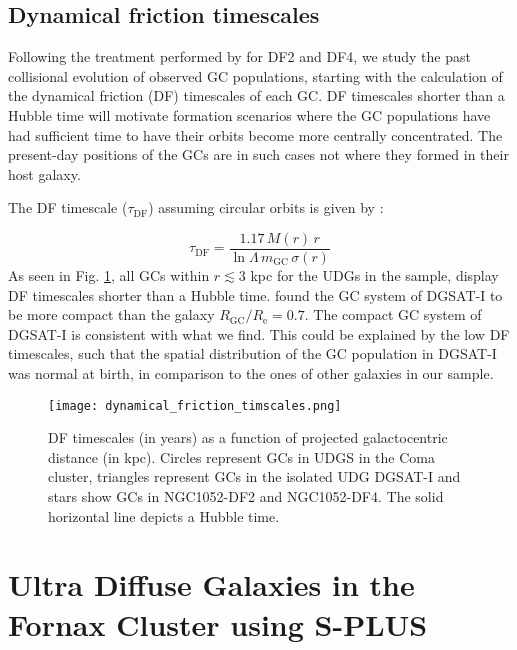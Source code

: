 \documentclass[baaa]{baaa}
\begin{document}
\subsection{Dynamical friction timescales }\label{subsec:DF}
Following the treatment performed by \cite{Leigh_Fragione} for DF2 and DF4, we study the past collisional evolution of observed GC populations, starting with the calculation of the dynamical friction (DF) timescales of each GC. DF timescales shorter than a Hubble time will motivate formation scenarios where the GC populations have had sufficient time to have their orbits become more centrally concentrated.   The present-day positions of the GCs are in such cases not where they formed in their host galaxy. 

The DF timescale ($\tau_{\textrm{DF}}$) assuming circular orbits is given by \citep{binney_tremaine_1987,gnedin_df}:

\begin{equation}
    \tau_{\textrm{DF}} = \frac{1.17 \, M(r) \, r}{\ln \Lambda \, m_{\textrm{GC}} \, \sigma(r)}
\end{equation}
As seen in Fig. \ref{fig:DFtimescales}, all GCs within $r\lesssim 3$ kpc for the UDGs in the sample, display DF timescales shorter than a Hubble time. \cite{Janssens2022} found the GC system of DGSAT-I to be more compact than the galaxy $R_{\textrm{GC}}/R_{\textrm{e}}=0.7$. The compact GC system of DGSAT-I is consistent with what we find.
This could be explained by the low DF timescales, such that the spatial distribution of the GC population in DGSAT-I was normal at birth, in comparison to the ones of other galaxies in our sample.

\begin{figure}[!ht]
    \centering
    \texttt{[image: dynamical\_friction\_timscales.png]}
    \caption{DF timescales (in years) as a function of projected galactocentric distance (in kpc). Circles represent GCs in UDGS in the Coma cluster, triangles represent GCs in the isolated UDG DGSAT-I and stars show GCs in NGC1052-DF2 and NGC1052-DF4. The solid horizontal line depicts a Hubble time.}
    \label{fig:DFtimescales}
\end{figure}



\section{Ultra Diffuse Galaxies in the Fornax Cluster using S-PLUS}\label{sec:splus}
\end{document}
